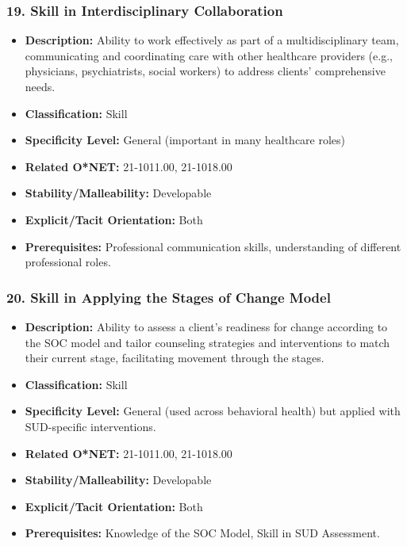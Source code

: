 \documentclass[
  letterpaper,
  DIV=11,
  numbers=noendperiod]{scrartcl}
\providecommand{\tightlist}{%
  \setlength{\itemsep}{0pt}\setlength{\parskip}{0pt}}
\begin{document}
\subsubsection{19. Skill in Interdisciplinary
Collaboration}\label{skill-in-interdisciplinary-collaboration}

\begin{itemize}
\tightlist
\item
  \textbf{Description:} Ability to work effectively as part of a
  multidisciplinary team, communicating and coordinating care with other
  healthcare providers (e.g., physicians, psychiatrists, social workers)
  to address clients' comprehensive needs.
\item
  \textbf{Classification:} Skill
\item
  \textbf{Specificity Level:} General (important in many healthcare
  roles)
\item
  \textbf{Related O*NET:} 21-1011.00, 21-1018.00
\item
  \textbf{Stability/Malleability:} Developable
\item
  \textbf{Explicit/Tacit Orientation:} Both
\item
  \textbf{Prerequisites:} Professional communication skills,
  understanding of different professional roles.
\end{itemize}

\subsubsection{20. Skill in Applying the Stages of Change
Model}\label{skill-in-applying-the-stages-of-change-model}

\begin{itemize}
\tightlist
\item
  \textbf{Description:} Ability to assess a client's readiness for
  change according to the SOC model and tailor counseling strategies and
  interventions to match their current stage, facilitating movement
  through the stages.
\item
  \textbf{Classification:} Skill
\item
  \textbf{Specificity Level:} General (used across behavioral health)
  but applied with SUD-specific interventions.
\item
  \textbf{Related O*NET:} 21-1011.00, 21-1018.00
\item
  \textbf{Stability/Malleability:} Developable
\item
  \textbf{Explicit/Tacit Orientation:} Both
\item
  \textbf{Prerequisites:} Knowledge of the SOC Model, Skill in SUD
  Assessment.
\end{itemize}
\end{document}
